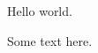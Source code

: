 \documentclass{article}
\begin{document}
Hello world.

Some text \undefinedmacro{} here.
\end{document}
